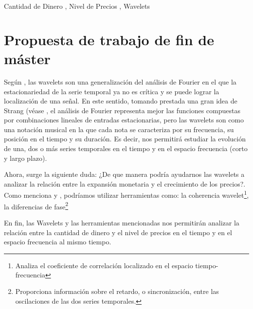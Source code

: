 \documentclass[a4paper,fleqn]{cas-sc}
\begin{document}
\begin{keywords}
    Cantidad de Dinero \sep
    Nivel de Precios \sep
    Wavelets
\end{keywords}

\maketitle


\section{Propuesta de trabajo de fin de máster}

Según \cite{Ramsey2016}, las wavelets son una generalización del análisis de Fourier en el que la estacionariedad de la serie temporal ya no es crítica y se puede lograr la localización de una señal. En este sentido, tomando prestada una gran idea de Strang (véase \cite{Strang1996}, el análisis de Fourier representa mejor las funciones compuestas por combinaciones lineales de entradas estacionarias, pero las wavelets son como una notación musical en la que cada nota se caracteriza por su frecuencia, su posición en el tiempo y su duración. Es decir, nos permitirá estudiar la evolución de una, dos o más series temporales en el tiempo y en el espacio frecuencia (corto y largo plazo). 

Ahora, surge la siguiente duda: ¿De que manera podría ayudarnos las wavelets a analizar la relación entre la expansión monetaria y el crecimiento de los precios?. Como menciona \cite{AguiarConraria2008} y \cite{Jiang2015}, podríamos utilizar herramientas como: la coherencia wavelet\footnote[1]{Analiza el coeficiente de correlación localizado en el espacio tiempo-frecuencia}, la diferencias de fase\footnote[2]{Proporciona información sobre el retardo, o sincronización, entre las oscilaciones de las dos series temporales.} 

En fin, las Wavelets y las herramientas mencionadas nos permitirán analizar la relación entre la cantidad de dinero y el nivel de precios en el tiempo y en el espacio frecuencia al mismo tiempo.
\end{document}

